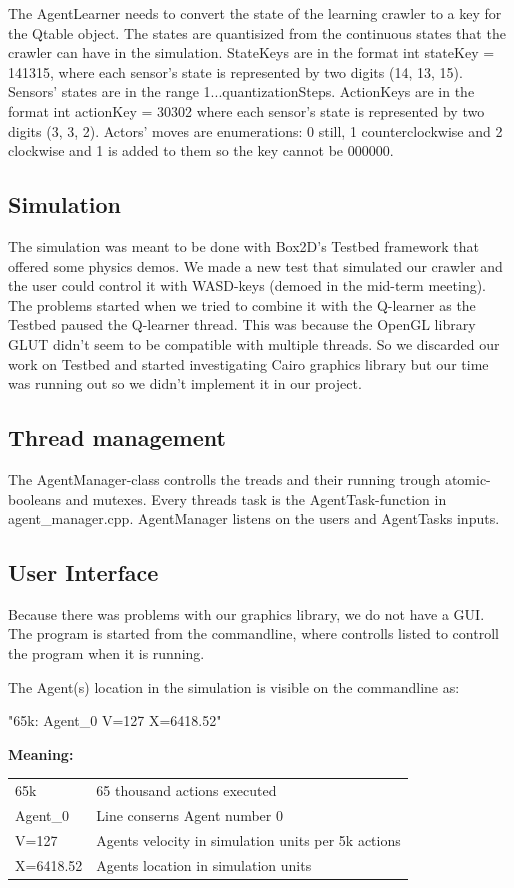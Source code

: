 \documentclass{article}
\begin{document}
The AgentLearner needs to convert the state of the learning crawler to a key
for the Qtable object. The states are quantisized from the continuous states
that the crawler can have in the simulation. StateKeys are in the format
int stateKey = 141315, where each sensor's
state is represented by two digits (14, 13, 15). Sensors' states are
in the range 1...quantizationSteps. ActionKeys are in the format
int actionKey = 30302 where each sensor's
state is represented by two digits (3, 3, 2). Actors' moves are
enumerations: 0 still, 1 counterclockwise and 2 clockwise and 1 is
added to them so the key cannot be 000000.

\subsection{Simulation}
The simulation was meant to be done with Box2D's Testbed framework that 
offered some physics demos. We made a new test that simulated our crawler
and the user could control it with WASD-keys (demoed in the mid-term meeting).
The problems started when we tried to combine it with the Q-learner as the
Testbed paused the Q-learner thread. This was because the OpenGL library GLUT
didn't seem to be compatible with multiple threads. So we discarded our work on
Testbed and started investigating Cairo graphics library but our time was running out
so we didn't implement it in our project. 

\subsection{Thread management}
The AgentManager-class controlls the treads and their running trough
atomic-booleans and mutexes. Every threads task is the AgentTask-function
in agent\_manager.cpp. AgentManager listens on the users and AgentTasks
inputs.

\subsection{User Interface}
Because there was problems with our graphics library, we do not have a GUI.
The program is started from the commandline, where controlls listed
to controll the program when it is running.

The Agent(s) location in the simulation is visible on the commandline as:

"65k: Agent\_0 V=127 X=6418.52"

\textbf{Meaning:}

\begin{tabular}{ll}
65k                     & 65 thousand actions executed \\
Agent\_0                & Line conserns Agent number 0 \\
V=127                   & Agents velocity in simulation units per 5k actions\\
X=6418.52               & Agents location in simulation units\\
\end{tabular}
\end{document}
